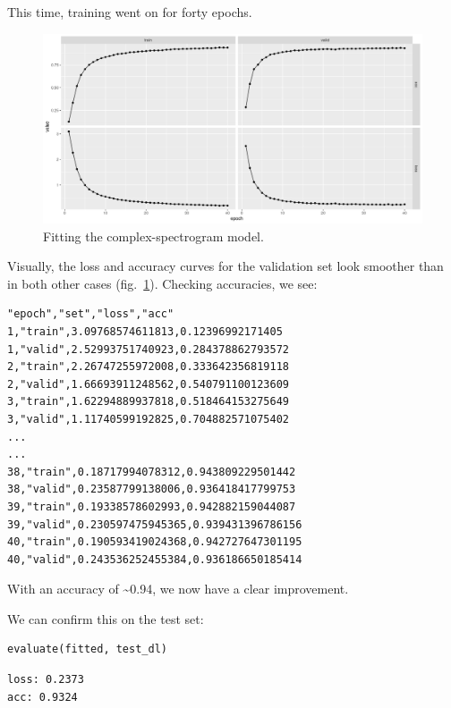 \documentclass[
  letterpaper,
]{krantz}
\begin{document}
This time, training went on for forty epochs.

\begin{figure}[H]

{\centering \includegraphics{images/audio-fit-complex.png}

}

\caption{\label{fig-audio-fit-complex}Fitting the complex-spectrogram
model.}

\end{figure}

Visually, the loss and accuracy curves for the validation set look
smoother than in both other cases (fig.~\ref{fig-audio-fit-complex}).
Checking accuracies, we see:

\begin{verbatim}
"epoch","set","loss","acc"
1,"train",3.09768574611813,0.12396992171405
1,"valid",2.52993751740923,0.284378862793572
2,"train",2.26747255972008,0.333642356819118
2,"valid",1.66693911248562,0.540791100123609
3,"train",1.62294889937818,0.518464153275649
3,"valid",1.11740599192825,0.704882571075402
...
...
38,"train",0.18717994078312,0.943809229501442
38,"valid",0.23587799138006,0.936418417799753
39,"train",0.19338578602993,0.942882159044087
39,"valid",0.230597475945365,0.939431396786156
40,"train",0.190593419024368,0.942727647301195
40,"valid",0.243536252455384,0.936186650185414
\end{verbatim}

With an accuracy of \textasciitilde0.94, we now have a clear
improvement.

We can confirm this on the test set:

\begin{verbatim}
evaluate(fitted, test_dl)
\end{verbatim}

\begin{verbatim}
loss: 0.2373
acc: 0.9324
\end{verbatim}
\end{document}
